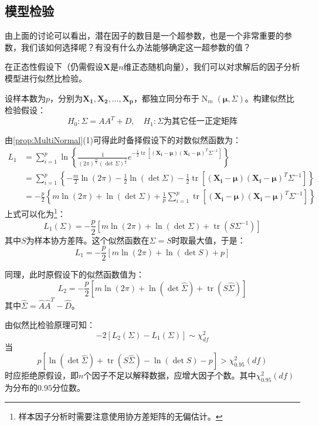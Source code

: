 \subsection{模型检验}
由上面的讨论可以看出，潜在因子的数目是一个超参数，也是一个非常重要的参数，我们该如何选择呢？有没有什么办法能够确定这一超参数的值？\par
\begin{derivation}
	在正态性假设下（仍需假设$\mathbf{X}$是$n$维正态随机向量），我们可以对求解后的因子分析模型进行似然比检验。\par
	设样本数为$p$，分别为$\mathbf{X_1},\mathbf{X_2},\dots,\mathbf{X_p}$，都独立同分布于$\operatorname{N}_m(\boldsymbol{\mu},\Sigma)$。构建似然比检验假设：
	\begin{equation*}
		H_0:\Sigma=AA^T+D,\quad H_1:\Sigma\text{为其它任一正定矩阵}
	\end{equation*}\par
	由\cref{prop:MultiNormal}(1)可得此时备择假设下的对数似然函数为：
	\begin{align*}
		L_1&=\sum_{i=1}^{p}\ln\left\{\frac{1}{(2\pi)^{\frac{m}{2}}(\det\Sigma)^{\frac{1}{2}}}e^{-\frac{1}{2}\operatorname{tr}[(\mathbf{X_i}-\boldsymbol{\mu})(\mathbf{X_i}-\boldsymbol{\mu})^T\Sigma^{-1}]}\right\} \\
		&=\sum_{i=1}^{p}\left\{-\frac{m}{2}\ln(2\pi)-\frac{1}{2}\ln(\det\Sigma)-\frac{1}{2}\operatorname{tr}[(\mathbf{X_i}-\boldsymbol{\mu})(\mathbf{X_i}-\boldsymbol{\mu})^T\Sigma^{-1}]\right\} \\
		&=-\frac{p}{2}\left\{m\ln(2\pi)+\ln(\det\Sigma)+\frac{1}{p}\sum_{i=1}^{p}\operatorname{tr}[(\mathbf{X_i}-\boldsymbol{\mu})(\mathbf{X_i}-\boldsymbol{\mu})^T\Sigma^{-1}]\right\}
	\end{align*}
	上式可以化为\footnote{样本因子分析时需要注意使用协方差矩阵的无偏估计。}：
	\begin{equation*}
		L_1(\Sigma)=-\frac{p}{2}\left[m\ln(2\pi)+\ln(\det\Sigma)+\operatorname{tr}(S\Sigma^{-1})\right]
	\end{equation*}
	其中$S$为样本协方差阵。这个似然函数在$\Sigma=S$时取最大值，于是：
	\begin{equation*}
		L_1=-\frac{p}{2}[m\ln(2\pi)+\ln(\det S)+p]
	\end{equation*}\par
	同理，此时原假设下的似然函数值为：
	\begin{equation*}
		L_2=-\frac{p}{2}\left[m\ln(2\pi)+\ln(\det\hat{\Sigma})+\operatorname{tr}(S\hat{\Sigma})\right]
	\end{equation*}
	其中$\hat{\Sigma}=\hat{A}\hat{A}^T-\hat{D}$。\par
	由似然比检验原理可知：
	\begin{equation*}
	-2[L_2(\Sigma)-L_1(\Sigma)]\sim\chi^2_{df}
	\end{equation*}
	当
	\begin{equation*}
		p[\ln(\det\hat{\Sigma})+\operatorname{tr}(S\hat{\Sigma})-\ln(\det S)-p]>\chi^2_{0.95}(df)
	\end{equation*}
	时应拒绝原假设，即$n$个因子不足以解释数据，应增大因子个数。其中$\chi^2_{0.95}(df)$为分布的$0.95$分位数。
\end{derivation}

